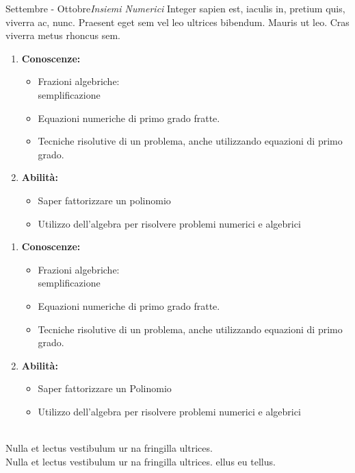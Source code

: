 \documentclass[10pt, a4paper twoside, notitlepage, notoc, justified]{tufte-handout}
\begin{document}
\begin{loggentry}{Settembre - Ottobre}{\em Insiemi Numerici}
Integer sapien est, iaculis in, pretium quis, viverra ac, nunc. Praesent eget sem vel leo ultrices bibendum. Mauris ut leo. Cras viverra metus rhoncus sem.

\begin{multicols}{2}
{\small
	\begin{enumerate}
		\item {\bf Conoscenze:}
		\begin{itemize}
			\item Frazioni algebriche:\\ semplificazione
			\item Equazioni numeriche di primo grado fratte.
			\item Tecniche risolutive di un problema, anche utilizzando equazioni di primo grado.
			\end{itemize}
		\item {\bf Abilità:}
		\begin{itemize}
			\item Saper fattorizzare un polinomio
			\item Utilizzo dell'algebra per risolvere problemi numerici e algebrici
			\end{itemize}
	\end{enumerate} 

\columnbreak

\begin{enumerate}
		\item {\bf Conoscenze:}
		\begin{itemize}
			\item Frazioni algebriche:\\ semplificazione
			\item Equazioni numeriche di primo grado fratte.
			\item Tecniche risolutive di un problema, anche utilizzando equazioni di primo grado.
		\end{itemize}
		\item {\bf Abilità:}
		\begin{itemize}
			\item Saper fattorizzare un Polinomio
			\item Utilizzo dell'algebra per risolvere problemi numerici e algebrici
		\end{itemize}
	\end{enumerate} 
}
\end{multicols}
\\ Nulla et lectus vestibulum ur na fringilla ultrices. 
\\ Nulla et lectus vestibulum ur na fringilla ultrices. ellus eu tellus.
\end{loggentry}
\end{document}

